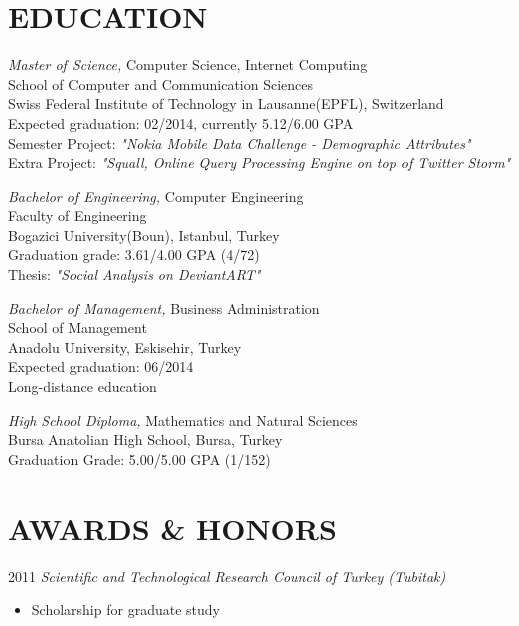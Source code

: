 \documentclass[line, margin]{res}
\begin{document}
\address{Avenue de Rhodanie 64 Chambre 524, 1007 Lausanne Switzerland, (+41) 78 926 9917}
\address{\textit{ferhat.elmas@epfl.ch \hspace{1.8cm} ferhatelmas.com \hspace{1.8cm} github.com/ferhatelmas}}
 
\begin{resume}
  
\section{EDUCATION}
				{\sl Master of Science,} Computer Science, Internet Computing\\
				School of Computer and Communication Sciences \\
				Swiss Federal Institute of Technology in Lausanne(EPFL), Switzerland \\
                Expected graduation: 02/2014, currently 5.12/6.00 GPA \\
                Semester Project: \textit{"Nokia Mobile Data Challenge - Demographic Attributes"} \\
                Extra Project: \textit{"Squall, Online Query Processing Engine on top of Twitter Storm"}
 
				{\sl Bachelor of Engineering,} Computer Engineering \\
				Faculty of Engineering \\
				Bogazici University(Boun), Istanbul, Turkey \\
				Graduation grade: 3.61/4.00 GPA (4/72) \\
                Thesis: \textit{"Social Analysis on DeviantART"}
 
				{\sl Bachelor of Management,}  Business Administration \\
				School of Management \\
				Anadolu University, Eskisehir, Turkey \\          
				Expected graduation: 06/2014 \\        
                Long-distance education

				{\sl High School Diploma,} Mathematics and Natural Sciences \\
				Bursa Anatolian High School, Bursa, Turkey \\
				Graduation Grade: 5.00/5.00 GPA (1/152)               

\section{AWARDS \& HONORS}
				2011 {\sl Scientific and Technological Research Council of Turkey (Tubitak)} \\
				\vspace{-.3cm}				
				\begin{itemize} 
					\item Scholarship for graduate study
				\end{itemize}
				

\end{resume}
\end{document}

